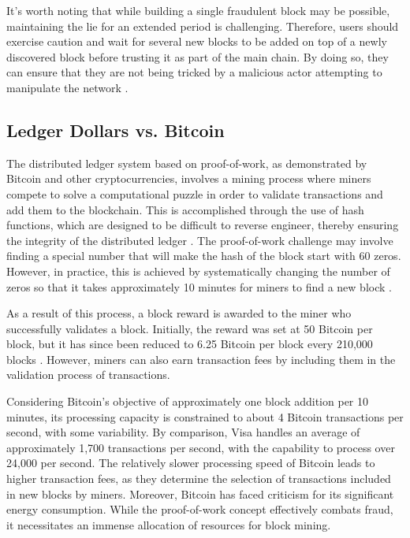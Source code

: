 It's worth noting that while building a single fraudulent block may be possible, maintaining the lie for an extended period is challenging. Therefore, users should exercise caution and wait for several new blocks to be added on top of a newly discovered block before trusting it as part of the main chain. By doing so, they can ensure that they are not being tricked by a malicious actor attempting to manipulate the network \cite{dupont2019cryptocurrencies}.

%

\subsection{Ledger Dollars vs. Bitcoin}
The distributed ledger system based on proof-of-work, as demonstrated by Bitcoin and other cryptocurrencies, involves a mining process where miners compete to solve a computational puzzle in order to validate transactions and add them to the blockchain. This is accomplished through the use of hash functions, which are designed to be difficult to reverse engineer, thereby ensuring the integrity of the distributed ledger \cite{bashir2017mastering}. The proof-of-work challenge may involve finding a special number that will make the hash of the block start with 60 zeros. However, in practice, this is achieved by systematically changing the number of zeros so that it takes approximately 10 minutes for miners to find a new block \cite{nakamoto2008bitcoin}.

As a result of this process, a block reward is awarded to the miner who successfully validates a block. Initially, the reward was set at 50 Bitcoin per block, but it has since been reduced to 6.25 Bitcoin per block every 210,000 blocks \cite{nakamoto2008bitcoin}. However, miners can also earn transaction fees by including them in the validation process of transactions.

%

Considering Bitcoin's objective of approximately one block addition per 10 minutes, its processing capacity is constrained to about 4 Bitcoin transactions per second, with some variability. By comparison, Visa handles an average of approximately 1,700 transactions per second, with the capability to process over 24,000 per second. The relatively slower processing speed of Bitcoin leads to higher transaction fees, as they determine the selection of transactions included in new blocks by miners. Moreover, Bitcoin has faced criticism for its significant energy consumption. While the proof-of-work concept effectively combats fraud, it necessitates an immense allocation of resources for block mining.

